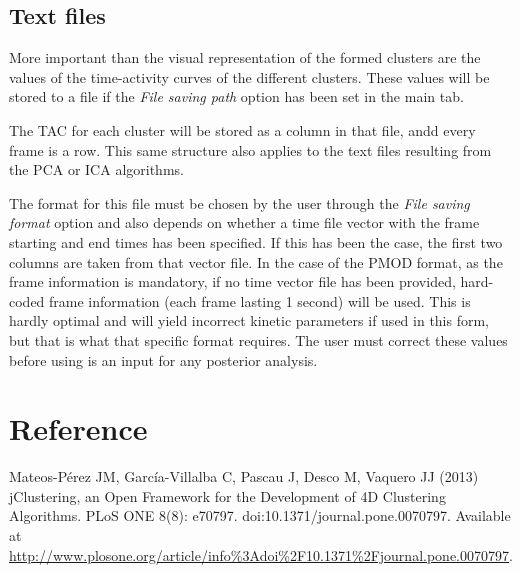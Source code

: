\documentclass[11pt]{article} %
\begin{document}
\subsection{Text files}
\label{subsec:results_text}

More important than the visual representation of the formed clusters are the values of the time-activity curves of the different
clusters. These values will be stored to a file if the {\em File saving path} option has been set in the main tab. 

The TAC for each cluster will be stored as a column in that file,
andd every frame is a row. This same structure also applies to the
text files resulting from the PCA or ICA algorithms.

The format for this file must be chosen by the user through the {\em File saving format} option and also depends on whether
a time file vector with the frame starting and end times has been specified. If this has been the case, the first two columns
are taken from that vector file. In the case of the PMOD format, as the frame information is mandatory, if no time vector file
has been provided, hard-coded frame information (each frame lasting 1 second) will be used. This is hardly optimal and will yield incorrect kinetic parameters if used in this form, but that is what that specific format requires. The user must correct these values before using is an input for any posterior analysis.

\section{Reference}
\label{sec:reference}

Mateos-Pérez JM, García-Villalba C, Pascau J, Desco M, Vaquero JJ (2013) jClustering, an Open Framework for the Development of 4D Clustering Algorithms. PLoS ONE 8(8): e70797. doi:10.1371/journal.pone.0070797. Available at
\url{http://www.plosone.org/article/info\%3Adoi\%2F10.1371\%2Fjournal.pone.0070797}.
\end{document}
